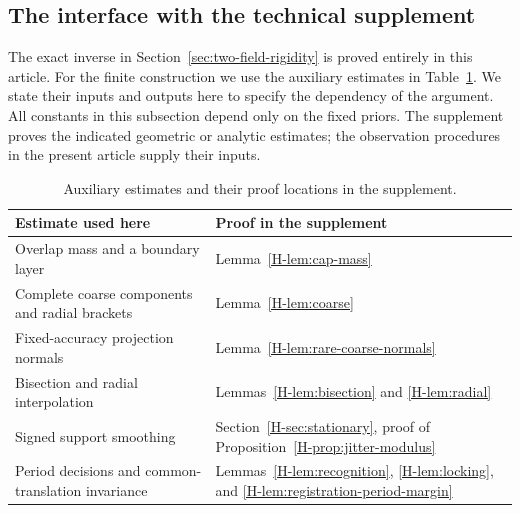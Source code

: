 \subsection{The interface with the technical supplement}
\label{sec:finite-interface}
The exact inverse in Section~\ref{sec:two-field-rigidity} is proved
entirely in this article. For the finite construction we use the
auxiliary estimates in Table~\ref{tab:finite-interface}. We state their
inputs and outputs here to specify the dependency of the argument.
All constants in this subsection depend only on the fixed priors.
The supplement proves the indicated geometric or analytic estimates;
the observation procedures in the present article supply their inputs.

\begin{table}[ht]
\centering
\small
\caption{Auxiliary estimates and their proof locations in the supplement.}
\label{tab:finite-interface}
\begin{tabular}{@{}p{}p{}@{}}
\toprule
Estimate used here & Proof in the supplement\\
\midrule
Overlap mass and a boundary layer &
Lemma~\ref{H-lem:cap-mass}\\[3pt]
Complete coarse components and radial brackets &
Lemma~\ref{H-lem:coarse}\\[3pt]
Fixed-accuracy projection normals &
Lemma~\ref{H-lem:rare-coarse-normals}\\[3pt]
Bisection and radial interpolation &
Lemmas~\ref{H-lem:bisection} and \ref{H-lem:radial}\\[3pt]
Signed support smoothing &
Section~\ref{H-sec:stationary}, proof of
Proposition~\ref{H-prop:jitter-modulus}\\[3pt]
Period decisions and common-translation invariance &
Lemmas~\ref{H-lem:recognition}, \ref{H-lem:locking}, and
\ref{H-lem:registration-period-margin}\\
\bottomrule
\end{tabular}
\end{table}

